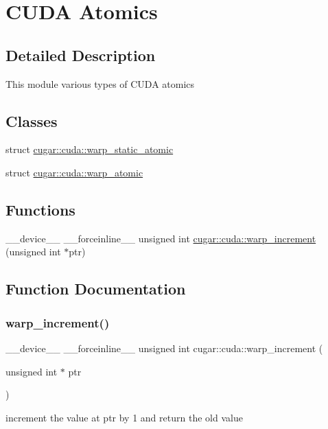 \hypertarget{group___c_u_d_a_atomics_module}{}\section{C\+U\+DA Atomics}
\label{group___c_u_d_a_atomics_module}


\subsection{Detailed Description}
This module various types of C\+U\+DA atomics \subsection*{Classes}
\begin{DoxyCompactItemize}
\item 
struct \hyperlink{structcugar_1_1cuda_1_1warp__static__atomic}{cugar\+::cuda\+::warp\+\_\+static\+\_\+atomic}
\item 
struct \hyperlink{structcugar_1_1cuda_1_1warp__atomic}{cugar\+::cuda\+::warp\+\_\+atomic}
\end{DoxyCompactItemize}
\subsection*{Functions}
\begin{DoxyCompactItemize}
\item 
\+\_\+\+\_\+device\+\_\+\+\_\+ \+\_\+\+\_\+forceinline\+\_\+\+\_\+ unsigned int \hyperlink{group___c_u_d_a_atomics_module_gafc8e36159201dad49d48ad3d2413f971}{cugar\+::cuda\+::warp\+\_\+increment} (unsigned int $\ast$ptr)
\end{DoxyCompactItemize}


\subsection{Function Documentation}
\mbox{\label{group___c_u_d_a_atomics_module_gafc8e36159201dad49d48ad3d2413f971}} 
\subsubsection{\texorpdfstring{warp\+\_\+increment()}{warp\_increment()}}
{\footnotesize\ttfamily \+\_\+\+\_\+device\+\_\+\+\_\+ \+\_\+\+\_\+forceinline\+\_\+\+\_\+ unsigned int cugar\+::cuda\+::warp\+\_\+increment (\begin{DoxyParamCaption}\item[{unsigned int $\ast$}]{ptr }\end{DoxyParamCaption})}

increment the value at ptr by 1 and return the old value 
